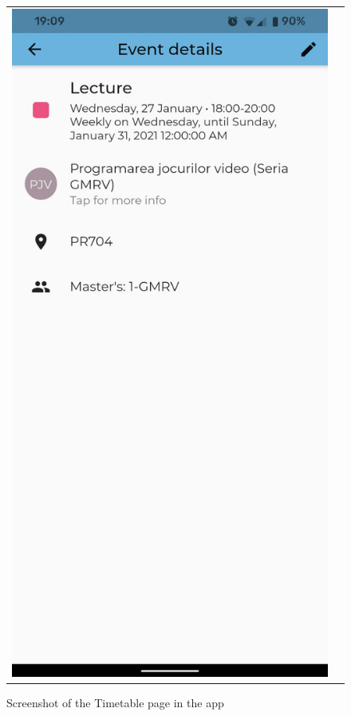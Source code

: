 \begin{figure}
\begin{tabular}{@{}cc@{}}
\begin{minipage}[b]{0.26\textwidth}
                    \captionsetup{labelsep=space, textformat=empty}
                    \caption{Screenshot of the Timetable page in the app}   
                    \label{2:fig:timetable}
                \end{minipage}
                \begin{minipage}[b]{0.26\textwidth} 
                    \includegraphics[width=\columnwidth]{figures/app/event.jpg}

\end{minipage}
\end{tabular}
\end{figure}
